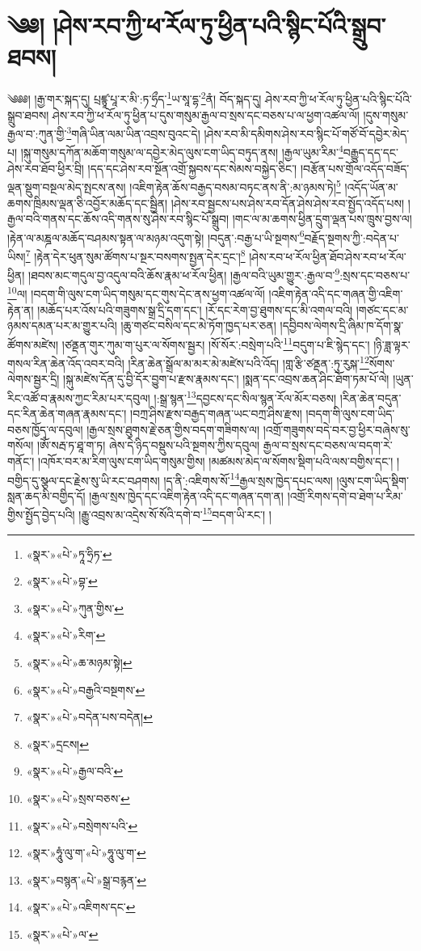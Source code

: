\chapter{༄༅། །ཤེས་རབ་ཀྱི་ཕ་རོལ་ཏུ་ཕྱིན་པའི་སྙིང་པོའི་སྒྲུབ་ཐབས།}༄༅༅། །རྒྱ་གར་སྐད་དུ། པྲཛྙཱ་པཱ་ར་མི་:ཏ་ཧྲྀད་\footnote{«སྣར་»«པེ་»ཏཱ་ཧྲིཏ་}ཡ་སཱ་དྷ་\footnote{«སྣར་»«པེ་»བྷ་}ནཾ། བོད་སྐད་དུ། ཤེས་རབ་ཀྱི་ཕ་རོལ་ཏུ་ཕྱིན་པའི་སྙིང་པོའི་སྒྲུབ་ཐབས། ཤེས་རབ་ཀྱི་ཕ་རོལ་ཏུ་ཕྱིན་པ་དུས་གསུམ་རྒྱལ་བ་སྲས་དང་བཅས་པ་ལ་ཕྱག་འཚལ་ལོ། །དུས་གསུམ་རྒྱལ་བ་:ཀུན་གྱི་\footnote{«སྣར་»«པེ་»ཀུན་གྱིས་}གཞི་ཡིན་ལམ་ཡིན་འབྲས་བུའང་དེ། །ཤེས་རབ་མི་དམིགས་ཤེས་རབ་སྙིང་པོ་གཙོ་བོ་དབྱེར་མེད་པ། །སྐུ་གསུམ་དཀོན་མཆོག་གསུམ་ལ་དབྱེར་མེད་ལུས་ངག་ཡིད་བཏུད་ནས། །རྒྱལ་ཡུམ་རིམ་\footnote{«སྣར་»«པེ་»རིག་}བརྒྱུད་དད་དང་ཤེས་རབ་ཐོབ་ཕྱིར་བྲི། །དད་དང་ཤེས་རབ་སྔོན་འགྲོ་སྐྱབས་དང་སེམས་བསྐྱེད་ཅིང་། །བརྩོན་པས་གྲོལ་འདོད་བཟོད་ལྡན་སྡུག་བསྔལ་མེད་སྤངས་ནས། །འཇིག་རྟེན་ཆོས་བརྒྱད་བསམ་བཏང་ནས་ནི་:མ་ཉམས་ཏེ།\footnote{«སྣར་»«པེ་»ཆ་མཉམ་སྟེ།} །འདོད་ཡོན་མ་ཆགས་ཁྲིམས་ལྡན་ཅི་འབྱོར་མཆོད་དང་སྦྱིན། །ཤེས་རབ་སྦྱངས་པས་ཤེས་རབ་དོན་ཤེས་ཤེས་རབ་སྤྱོད་འདོད་པས། །རྒྱལ་བའི་གནས་དང་ཆོས་འདི་གནས་སུ་ཤེས་རབ་སྙིང་པོ་སྒྲུབ། །གང་ལ་མ་ཆགས་ཕྱིན་དྲུག་ལྡན་པས་ཁྲུས་བྱས་ལ། །རྟེན་ལ་མཎྜལ་མཆོད་བཤམས་སྟན་ལ་མཉམ་འདུག་སྟེ། །བདུན་:བརྒྱ་པ་ཡི་སྔགས་\footnote{«སྣར་»«པེ་»བརྒྱའི་བསྔགས་}བརྗོད་སྔགས་ཀྱི་:བདེན་པ་ཡིས།\footnote{«སྣར་»«པེ་»བདེན་པས་བདེན།} །རྟེན་དེར་ཕུན་སུམ་ཚོགས་པ་སྔར་བསགས་སྤྱན་དེར་དྲང་།\footnote{«སྣར་»དྲངས།} །ཤེས་རབ་ཕ་རོལ་ཕྱིན་ཐོབ་ཤེས་རབ་ཕ་རོལ་ཕྱིན། །ཐབས་མང་གདུལ་བྱ་འདུལ་བའི་ཆོས་རྣམ་ཕ་རོལ་ཕྱིན། །རྒྱལ་བའི་ཡུམ་གྱུར་:རྒྱལ་བ་\footnote{«སྣར་»«པེ་»རྒྱལ་བའི་}:སྲས་དང་བཅས་པ་\footnote{«སྣར་»«པེ་»སྲས་བཅས་}ལ། །བདག་གི་ལུས་ངག་ཡིད་གསུམ་དང་གུས་དེང་ནས་ཕྱག་འཚལ་ལོ། །འཇིག་རྟེན་འདི་དང་གཞན་གྱི་འཇིག་རྟེན་ན། །མཆོད་པར་འོས་པའི་གཟུགས་སྒྲ་དྲི་དག་དང་། །རོ་དང་རེག་བྱ་ཐུགས་དང་མི་འགལ་བའི། །གཙང་དང་མ་ཉམས་དམན་པར་མ་གྱུར་པའི། །ཆུ་གཙང་བསིལ་དང་མེ་ཏོག་ཁྱད་པར་ཅན། །དབྱིབས་ལེགས་དྲི་ཞིམ་ཁ་དོག་སྣ་ཚོགས་མཛེས། །ཙནྡན་གུར་ཀུམ་ག་པུར་ལ་སོགས་སྦྱར། །སོ་སོར་:བསྲེག་པའི་\footnote{«སྣར་»«པེ་»བསྲེགས་པའི་}བདུག་པ་ཇི་སྙེད་དང་། །ཉི་ཟླ་ལྟར་གསལ་རིན་ཆེན་འོད་འབར་བའི། །རིན་ཆེན་སྒྲོལ་མ་མར་མེ་མཛེས་པའི་འོད། །གླ་རྩི་ཙནྡན་:ཏུ་རུསྐ་\footnote{«སྣར་»ཧཱུཾ་ལུ་ག་«པེ་»ཧཱུ་ལུ་ག་}སོགས་ལེགས་སྦྱར་དྲི། །སྐུ་མཛེས་དོན་དུ་བྱི་དོར་བྱུག་པ་རྫས་རྣམས་དང་། །སྨན་དང་འབྲས་ཆན་ཤིང་ཐོག་ཏམ་པོ་ལེ། །ཡུན་རིང་འཚོ་བ་རྣམས་ཀྱང་རིམ་པར་དབུལ། །:སྒྲ་སྙན་\footnote{«སྣར་»བསྙན་«པེ་»སྒྲ་བརྙན་}དབྱངས་དང་སིལ་སྙན་རོལ་མོར་བཅས། །རིན་ཆེན་བདུན་དང་རིན་ཆེན་གཞན་རྣམས་དང་། །བཀྲ་ཤིས་རྫས་བརྒྱད་གཞན་ཡང་བཀྲ་ཤིས་རྫས། །བདག་གི་ལུས་ངག་ཡིད་བཅས་ཁྱོད་ལ་དབུལ། །རྒྱལ་སྲས་ཐུགས་རྗེ་ཅན་གྱིས་བདག་གཟིགས་ལ། །འགྲོ་གཟུགས་བདེ་བར་བྱ་ཕྱིར་བཞེས་སུ་གསོལ། །ཨོཾ་སརྦ་ཏ་ཐཱ་ག་ཏ། ཞེས་དེ་ཉིད་བསྡུས་པའི་སྔགས་ཀྱིས་དབུལ། རྒྱལ་བ་སྲས་དང་བཅས་ལ་བདག་རེ་གནོང་། །འཁོར་བར་མ་རིག་ལུས་ངག་ཡིད་གསུམ་གྱིས། །མཚམས་མེད་ལ་སོགས་སྡིག་པའི་ལས་བགྱིས་དང་། །བགྱིད་དུ་སྩལ་དང་རྗེས་སུ་ཡི་རང་བཤགས། །ད་ནི་:འཇིགས་སོ་\footnote{«སྣར་»«པེ་»འཇིགས་དང་}རྒྱལ་སྲས་ཁྱེད་དཔང་ལས། །ལུས་ངག་ཡིད་སྡིག་སླན་ཆད་མི་བགྱིད་དོ། །རྒྱལ་སྲས་ཁྱེད་དང་འཇིག་རྟེན་འདི་དང་གཞན་དག་ན། །འགྲོ་རིགས་དགེ་བ་ཐེག་པ་རིམ་གྱིས་སྤྱོད་བྱེད་པའི། །རྒྱུ་འབྲས་མ་འདྲེས་སོ་སོའི་དགེ་བ་\footnote{«སྣར་»«པེ་»ལ་}བདག་ཡི་རང་། །
